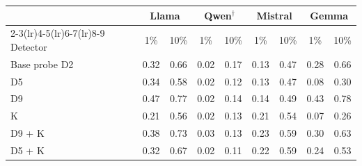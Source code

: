 \begin{tabular}{@{}l cc cc cc cc@{}}
\toprule
 & \multicolumn{2}{c}{Llama} & \multicolumn{2}{c}{Qwen$^\dagger$} & \multicolumn{2}{c}{Mistral} & \multicolumn{2}{c}{Gemma} \\
\cmidrule(lr){2-3}\cmidrule(lr){4-5}\cmidrule(lr){6-7}\cmidrule(lr){8-9}
Detector & 1\% & 10\% & 1\% & 10\% & 1\% & 10\% & 1\% & 10\% \\
\midrule
Base probe D2 & 0.32 & 0.66 & 0.02 & 0.17 & 0.13 & 0.47 & 0.28 & 0.66 \\
D5 & 0.34 & 0.58 & 0.02 & 0.12 & 0.13 & 0.47 & 0.08 & 0.30 \\
D9 & 0.47 & 0.77 & 0.02 & 0.14 & 0.14 & 0.49 & 0.43 & 0.78 \\
K & 0.21 & 0.56 & 0.02 & 0.13 & 0.21 & 0.54 & 0.07 & 0.26 \\
D9 + K & 0.38 & 0.73 & 0.03 & 0.13 & 0.23 & 0.59 & 0.30 & 0.63 \\
D5 + K & 0.32 & 0.67 & 0.02 & 0.11 & 0.22 & 0.59 & 0.24 & 0.53 \\
\bottomrule
\end{tabular}
